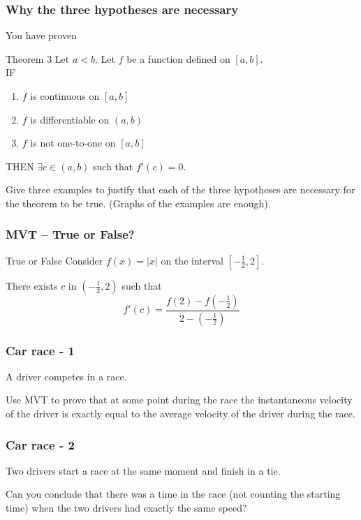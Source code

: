 \begin{frame}
	\frametitle{Why the three hypotheses are necessary}

	You have proven

	\begin{block}{Theorem 3}
		Let $a<b$. Let $f$ be a function defined on $[a,b]$. \\ IF
		\begin{enumerate}
			\item $f$ is continuous on $[a,b]$

			\item $f$ is differentiable on $(a,b)$

			\item $f$ is not one-to-one on $[a,b]$
		\end{enumerate}
		THEN $\displaystyle \exists c \in (a,b)$ such that $f'(c)=0$.
	\end{block}

	\vfill

	Give three examples to justify that each of the three hypotheses are necessary
	for the theorem to be true. (Graphs of the examples are enough).
\end{frame}

\begin{frame}[t]
	\frametitle{MVT -- True or False?}

	\begin{block}{True or False}
		Consider $f(x) = |x|$ on the interval $[-\frac{1}{2}, 2]$.

		There exists $c$ in $(-\frac{1}{2},2)$ such that
		\[
			f'(c) = \frac{f(2) - f(-\frac{1}{2})}{2-(-\frac{1}{2})}
		\]
	\end{block}
\end{frame}

\begin{frame}[t]
	\fontsize{13}{13}\selectfont
	\frametitle{Car race - 1}

	A driver competes in a race.

	Use MVT to prove that at some point during the race the instantaneous velocity
	of the driver is exactly equal to the average velocity of the driver during the
	race.
\end{frame}

\begin{frame}[t]
	\fontsize{13}{13}\selectfont
	\frametitle{Car race - 2}

	Two drivers start a race at the same moment and finish in a tie.

	Can you conclude that there was a time in the race (not counting the starting
	time) when the two drivers had exactly the same speed?
\end{frame}

